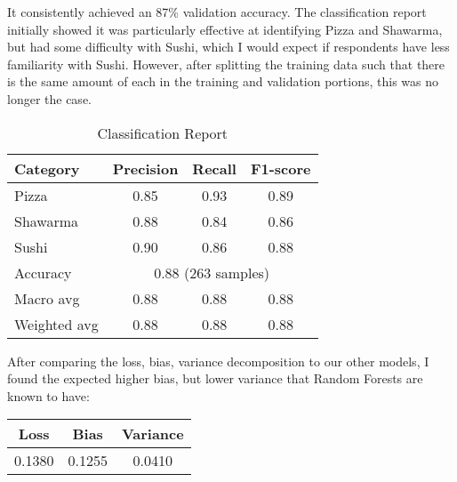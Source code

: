 It consistently achieved an 87\% validation accuracy. The classification report initially showed it was particularly effective at identifying Pizza and Shawarma, but had some difficulty with Sushi, which I would expect if respondents have less familiarity with Sushi. However, after splitting the training data such that there is the same amount of each in the training and validation portions, this was no longer the case.
\begin{table}[h]
    \centering
    \begin{tabular}{lccc}
        \hline
        Category & Precision & Recall & F1-score \\ 
        \hline
        Pizza    & 0.85 & 0.93 & 0.89 \\
        Shawarma & 0.88 & 0.84 & 0.86 \\
        Sushi    & 0.90 & 0.86 & 0.88 \\
        \hline
        Accuracy      & \multicolumn{3}{c}{0.88 (263 samples)} \\
        Macro avg     & 0.88 & 0.88 & 0.88 \\
        Weighted avg  & 0.88 & 0.88 & 0.88 \\
        \hline
    \end{tabular}
    \caption{Classification Report}
    \label{tab:classification_report}
\end{table}

After comparing the loss, bias, variance decomposition to our other models, I found the expected higher bias, but lower variance that Random Forests are known to have:
\begin{table}[h]
    \centering
    \begin{tabular}{ccc}
        \hline
        Loss & Bias & Variance \\ 
        \hline
        0.1380 & 0.1255 & 0.0410 \\
        \hline
    \end{tabular}
    \label{tab:loss_report}
\end{table}
